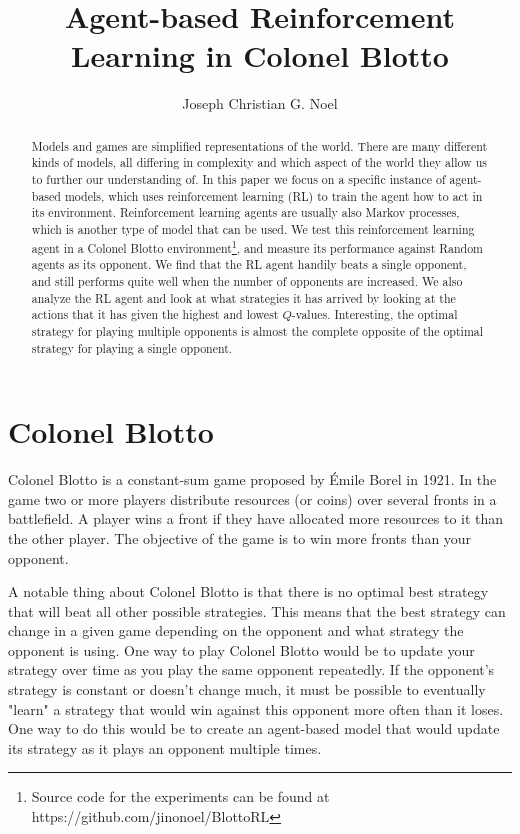 \documentclass[11pt, oneside]{article}   	%
\title{Agent-based Reinforcement Learning in Colonel Blotto}
\author{Joseph Christian G. Noel}
\date{}							%
\begin{document}
\maketitle

\begin{abstract}
Models and games are simplified representations of the world. There are many different kinds of models, all differing in complexity and which aspect of the world they allow us to further our understanding of. In this paper we focus on a specific instance of agent-based models, which uses reinforcement learning (RL) to train the agent how to act in its environment. Reinforcement learning agents are usually also Markov processes, which is another type of model that can be used. We test this reinforcement learning agent in a Colonel Blotto environment\footnote{Source code for the experiments can be found at https://github.com/jinonoel/BlottoRL}, and measure its performance against Random agents as its opponent. We find that the RL agent handily beats a single opponent, and still performs quite well when the number of opponents are increased. We also analyze the RL agent and look at what strategies it has arrived by looking at the actions that it has given the highest and lowest $Q$-values. Interesting, the optimal strategy for playing multiple opponents is almost the complete opposite of the optimal strategy for playing a single opponent.

 \end{abstract}
 
\section{Colonel Blotto}

Colonel Blotto is a constant-sum game proposed by Émile Borel in 1921\cite{Borel1953}. In the game two or more players distribute resources (or coins) over several fronts in a battlefield. A player wins a front if they have allocated more resources to it than the other player. The objective of the game is to win more fronts than your opponent.

\hfill

A notable thing about Colonel Blotto is that there is no optimal best strategy that will beat all other possible strategies. This means that the best strategy can change in a given game depending on the opponent and what strategy the opponent is using. One way to play Colonel Blotto would be to update your strategy over time as you play the same opponent repeatedly. If the opponent's strategy is constant or doesn't change much, it must be possible to eventually "learn" a strategy that would win against this opponent more often than it loses. One way to do this would be to create an agent-based model that would update its strategy as it plays an opponent multiple times.
\end{document}
